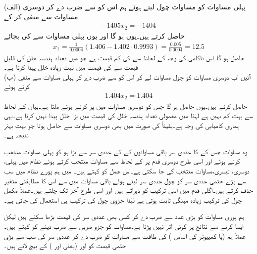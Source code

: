 (الف)  پہلی مساوات کو مساوات چول لیتے ہوئے ہم اس کو  سے ضرب دے کر دوسری مساوات سے منفی کر کے
\begin{align*}
-1405x_2=-1404
\end{align*}
حاصل کرتے ہیں۔یوں  ہو گا اور یوں پہلی مساوات سے  کی بجائے 
\begin{align*}
x_1=\frac{1}{0.0004}(1.406-1.402\cdot 0.9993)=\frac{0.005}{0.0004}=12.5
\end{align*}
حاصل ہو گا۔اس ناکامی کی وجہ  کے لحاظ سے   کی کم قیمت ہے جو  میں تعداد ہندسہ خلل کی قلیل قیمت سے  کی قیمت میں بہت زیادہ خلل پیدا کرتا ہے۔\\
(ب) آئیں اب دوسری مساوات کو چول مساوات لے کر اس کو  سے ضرب دے کر پہلی مساوات سے منفی کرتے ہوئے
\begin{align*}
1.404x_2=1.404
\end{align*}
حاصل کرتے ہیں۔یوں  حاصل ہو گا جس کو دوسری مساوات میں پر کرتے ہوئے  ملتا ہے۔یہاں  کے لحاظ سے  بہت کم نہیں ہے لہٰذا  میں معمولی تعداد ہندسہ خلل  کی قیمت میں بڑا خلل پیدا نہیں کرتا ہے۔یہی ہماری کامیابی کی  وجہ ہے۔یقیناً  کی صورت میں بھی دوسری مساوات سے  حاصل ہوتا جو بہت بہتر نتیجہ  ہے۔

وہ مساوات جس کے  کا عددی سر باقی مساواتوں کے  کے عددی سر سے بڑا ہو کو پہلی مساوات منتخب کرتے ہوئے اور اسی طرح دوسری قدم پر  کے لحاظ سے مساوات منتخب کرتے ہوئے نظام میں پہلی، دوسری، تیسری، مساوات منتخب کی جا سکتی ہے۔اس عمل کو  کہتے ہیں۔  میں ہم  پورے نظام میں سب سے بڑے حتمی عددی سر کو چول عددی سر لیتے ہوئے باقی مساوات میں سے اس کا مطابقتی متغیر حذف کرتے ہیں۔اگلی قدم میں اسی ترکیب کو دہراتے ہیں اور اسی طرح آخر تک چلتے ہیں۔عملاً مکمل چول کی ترکیب زیادہ مہنگی ثابت ہوتی ہے لہٰذا جزوی چول کی ترکیب ہی استعمال کی جاتی ہے۔

ہم پوری مساوات کو بڑی عدد سے ضرب دے کر کسی بھی عددی سر کی قیمت بڑھا سکتے ہیں لیکن ایسا کرنے سے نتائج پر کوئی اثر نہیں پڑتا ہے۔مساوات کو جزو ضربی سے ضرب دینے کو   کہتے ہیں۔عملاً ہم  (یا کمپیوٹر کی اساس ) کی طاقت سے مساوات کو ضرب دے کر عددی سر کی سب سے بڑی حتمی قیمت کو  اور  (یعنی  اور ) کے بیچ لاتے ہیں۔

